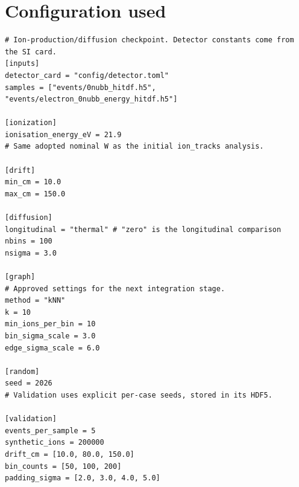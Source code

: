 \documentclass[11pt]{article}
\begin{document}
\section*{Configuration used}
\small\begin{verbatim}
# Ion-production/diffusion checkpoint. Detector constants come from the SI card.
[inputs]
detector_card = "config/detector.toml"
samples = ["events/0nubb_hitdf.h5", "events/electron_0nubb_energy_hitdf.h5"]

[ionization]
ionisation_energy_eV = 21.9
# Same adopted nominal W as the initial ion_tracks analysis.

[drift]
min_cm = 10.0
max_cm = 150.0

[diffusion]
longitudinal = "thermal" # "zero" is the longitudinal comparison
nbins = 100
nsigma = 3.0

[graph]
# Approved settings for the next integration stage.
method = "kNN"
k = 10
min_ions_per_bin = 10
bin_sigma_scale = 3.0
edge_sigma_scale = 6.0

[random]
seed = 2026
# Validation uses explicit per-case seeds, stored in its HDF5.

[validation]
events_per_sample = 5
synthetic_ions = 200000
drift_cm = [10.0, 80.0, 150.0]
bin_counts = [50, 100, 200]
padding_sigma = [2.0, 3.0, 4.0, 5.0]

\end{verbatim}
\end{document}
